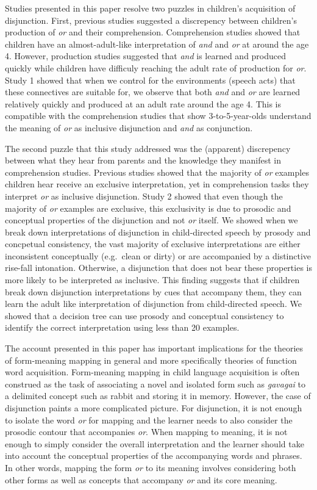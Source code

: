 \documentclass[10pt, letterpaper]{article}
\begin{document}
Studies presented in this paper resolve two puzzles in children's
acquisition of disjunction. First, previous studies suggested a
discrepency between children's production of \emph{or} and their
comprehension. Comprehension studies showed that children have an
almost-adult-like interpretation of \emph{and} and \emph{or} at around
the age 4. However, production studies suggested that \emph{and} is
learned and produced quickly while children have difficuly reaching the
adult rate of production for \emph{or}. Study 1 showed that when we
control for the environments (speech acts) that these connectives are
suitable for, we observe that both \emph{and} and \emph{or} are learned
relatively quickly and produced at an adult rate around the age 4. This
is compatible with the comprehension studies that show 3-to-5-year-olds
understand the meaning of \emph{or} as inclusive disjunction and
\emph{and} as conjunction.

The second puzzle that this study addressed was the (apparent)
discrepency between what they hear from parents and the knowledge they
manifest in comprehension studies. Previous studies showed that the
majority of \emph{or} examples children hear receive an exclusive
interpretation, yet in comprehension tasks they interpret \emph{or} as
inclusive disjunction. Study 2 showed that even though the majority of
\emph{or} examples are exclusive, this exclusivity is due to prosodic
and conceptual properties of the disjunction and not \emph{or} itself.
We showed when we break down interpretations of disjunction in
child-directed speech by prosody and concpetual consistency, the vast
majority of exclusive interpretations are either inconsistent
conceptually (e.g.~clean or dirty) or are accompanied by a distinctive
rise-fall intonation. Otherwise, a disjunction that does not bear these
properties is more likely to be interpreted as inclusive. This finding
suggests that if children break down disjunction interpretations by cues
that accompany them, they can learn the adult like interpretation of
disjunction from child-directed speech. We showed that a decision tree
can use prosody and conceptual consistency to identify the correct
interpretation using less than 20 examples.

The account presented in this paper has important implications for the
theories of form-meaning mapping in general and more specifically
theories of function word acquisition. Form-meaning mapping in child
language acquisition is often construed as the task of associating a
novel and isolated form such as \emph{gavagai} to a delimited concept
such as rabbit and storing it in memory. However, the case of
disjunction paints a more complicated picture. For disjunction, it is
not enough to isolate the word \emph{or} for mapping and the learner
needs to also consider the prosodic contour that accompanies \emph{or}.
When mapping to meaning, it is not enough to simply consider the overall
interpretation and the learner should take into account the conceptual
properties of the accompanying words and phrases. In other words,
mapping the form \emph{or} to its meaning involves considering both
other forms as well as concepts that accompany \emph{or} and its core
meaning.
\end{document}
